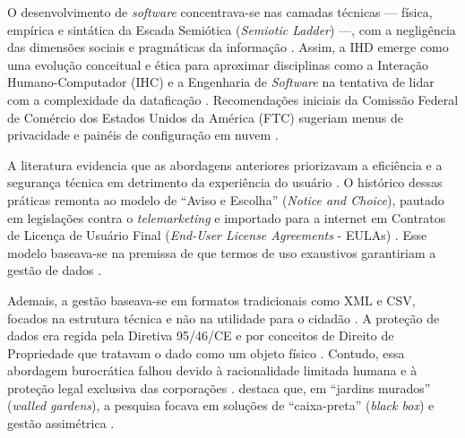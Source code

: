 \documentclass[
	12pt,				%
	oneside,			%
	a4paper,			%
	english,			%
	brazil				%
	]{abntex2ppgsi}
\begin{document}
    O desenvolvimento de \textit{software} concentrava-se nas camadas técnicas — física, empírica e sintática da Escada Semiótica (\textit{Semiotic Ladder}) —, com a negligência das dimensões sociais e pragmáticas da informação \cite{Strey2019Human}. Assim, a IHD emerge como uma evolução conceitual e ética para aproximar disciplinas como a Interação Humano-Computador (IHC) e a Engenharia de \textit{Software} na tentativa de lidar com a complexidade da dataficação \cite{Strey2019Human, Pereira, Sailaja2024334, Bowyer2022, Bartram2022, Koesten2020, Haghighati2020, Koesten2021, Coleti2019DesigPatterns}. Recomendações iniciais da Comissão Federal de Comércio dos Estados Unidos da América (FTC) sugeriam menus de privacidade e painéis de configuração em nuvem \cite{Crabtree2016}.

    A literatura evidencia que as abordagens anteriores priorizavam a eficiência e a segurança técnica em detrimento da experiência do usuário \cite{Coleti2024, Meechan2023, Locoro2020}. O histórico dessas práticas remonta ao modelo de ``Aviso e Escolha'' (\textit{Notice and Choice}), pautado em legislações contra o \textit{telemarketing} e importado para a internet em Contratos de Licença de Usuário Final (\textit{End-User License Agreements} - EULAs) \cite{Coleti2020TR, Hutton2017, Jones2017}. Esse modelo baseava-se na premissa de que termos de uso exaustivos garantiriam a gestão de dados \cite{malgieri2020vulnerable, chalhoub2024useful}. 

    Ademais, a gestão baseava-se em formatos tradicionais como XML e CSV, focados na estrutura técnica e não na utilidade para o cidadão \cite{Belizario2023Interacao}. A proteção de dados era regida pela Diretiva 95/46/CE e por conceitos de Direito de Propriedade que tratavam o dado como um objeto físico \cite{malgieri2019automated, janecek2018ownership, angelopoulos2021stewardship}. Contudo, essa abordagem burocrática falhou devido à racionalidade limitada humana e à proteção legal exclusiva das corporações \cite{Sailaja2021, Chatzimichali2021160, DeAlmeida2019}.  destaca que, em ``jardins murados'' (\textit{walled gardens}), a pesquisa focava em soluções de ``caixa-preta'' (\textit{black box}) e gestão assimétrica \cite{DOWTHWAITE2024, Theys2024, Theys, Turkay2021, Lockwood2021, Crabtree2021, Lockwood2020AnAccessible}.
\end{document}
